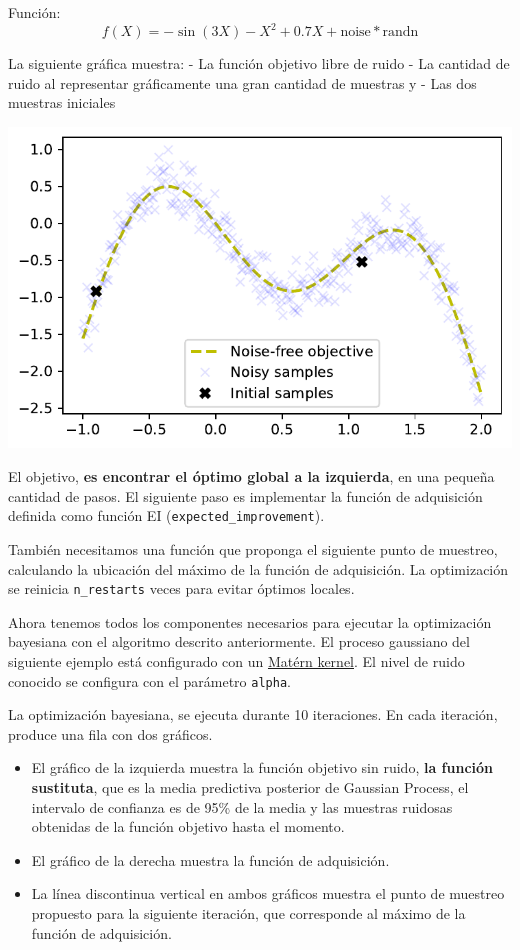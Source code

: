 \documentclass[
  12pt,
  letterpaper,
  DIV=11,
  numbers=noendperiod]{scrartcl}
\providecommand{\tightlist}{%
  \setlength{\itemsep}{0pt}\setlength{\parskip}{0pt}}\usepackage{longtable,booktabs,array}
\begin{document}
Función: \[
f(X)=-\sin(3X)-X^2+0.7X + \text{noise}*\text{randn}
\]

La siguiente gráfica muestra: - La función objetivo libre de ruido - La
cantidad de ruido al representar gráficamente una gran cantidad de
muestras y - Las dos muestras iniciales

\includegraphics{ProyFinal_OptBayesiana_2024_files/figure-pdf/cell-3-output-1.pdf}

El objetivo, \textbf{es encontrar el óptimo global a la izquierda}, en
una pequeña cantidad de pasos. El siguiente paso es implementar la
función de adquisición definida como función EI
(\texttt{expected\_improvement}).

También necesitamos una función que proponga el siguiente punto de
muestreo, calculando la ubicación del máximo de la función de
adquisición. La optimización se reinicia \texttt{n\_restarts} veces para
evitar óptimos locales.

Ahora tenemos todos los componentes necesarios para ejecutar la
optimización bayesiana con el algoritmo descrito anteriormente. El
proceso gaussiano del siguiente ejemplo está configurado con un
\href{http://scikit-learn.org/stable/modules/gaussian_process.html\#matern-kernel}{Matérn
kernel}. El nivel de ruido conocido se configura con el parámetro
\texttt{alpha}.

La optimización bayesiana, se ejecuta durante 10 iteraciones. En cada
iteración, produce una fila con dos gráficos.

\begin{itemize}
\tightlist
\item
  El gráfico de la izquierda muestra la función objetivo sin ruido,
  \textbf{la función sustituta}, que es la media predictiva posterior de
  Gaussian Process, el intervalo de confianza es de 95\% de la media y
  las muestras ruidosas obtenidas de la función objetivo hasta el
  momento.
\item
  El gráfico de la derecha muestra la función de adquisición.
\item
  La línea discontinua vertical en ambos gráficos muestra el punto de
  muestreo propuesto para la siguiente iteración, que corresponde al
  máximo de la función de adquisición.
\end{itemize}
\end{document}
